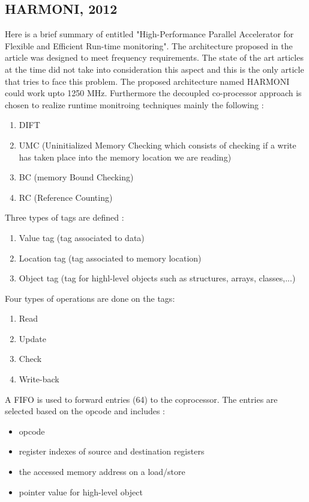 \documentclass[10pt,a4paper, oneside]{memoir}
\begin{document}
\subsection{HARMONI, 2012 \cite{Deng:2012:HPA:2354410.2355153}}
Here is a brief summary of entitled "High-Performance Parallel Accelerator for Flexible and Efficient Run-time monitoring".
The architecture proposed in the article was designed to meet frequency requirements. The state of the art articles at the time did not take into consideration this aspect and this is the only article that tries to face this problem. The proposed architecture named HARMONI could work upto 1250 MHz. Furthermore the decoupled co-processor approach is chosen to realize runtime monitroing techniques mainly the following : 
\begin{enumerate}
\item DIFT
\item UMC (Uninitialized Memory Checking which consists of checking if a write has taken place into the memory location we are reading)
\item BC (memory Bound Checking)
\item RC (Reference Counting)
\end{enumerate}


Three types of tags are defined : 
\begin{enumerate}
\item Value tag (tag associated to data)
\item Location tag (tag associated to memory location)
\item Object tag (tag for highl-level objects such as structures, arrays, classes,...)
\end{enumerate}
Four types of operations are done on the tags: 
\begin{enumerate}
\item Read
\item Update 
\item Check 
\item Write-back
\end{enumerate}

A FIFO is used to forward entries (64) to the coprocessor. The entries are selected based on the opcode and includes : 
\begin{itemize}
\item opcode
\item register indexes of source and destination registers
\item the accessed memory address on a load/store 
\item pointer value for high-level object
\end{itemize}
\end{document}
